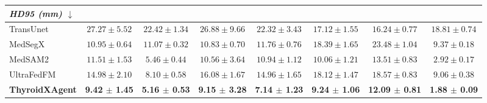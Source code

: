\documentclass[fleqn,10pt]{wlscirep}
\begin{document}
\begin{appendices}
\begin{table}[p]
\begin{threeparttable}
\begin{tabular}{lccccccc}
\midrule
\multicolumn{8}{l}{\textit{HD95 (mm) $\downarrow$}} \\
\midrule
TransUnet~\cite{chen2024transunet}
& $27.27 \pm 5.52$
& $22.42 \pm 1.34$
& $26.88 \pm 9.66$
& $22.32 \pm 3.43$
& $17.12 \pm 1.55$
& $16.24 \pm 0.77$
& $18.81 \pm 0.74$ \\
MedSegX~\cite{zhang2025generalist}
& $10.95 \pm 0.64$
& $11.07 \pm 0.32$
& $10.83 \pm 0.70$
& $11.76 \pm 0.76$
& $18.39 \pm 1.65$
& $23.48 \pm 1.04$
& $9.37 \pm 0.18$ \\
MedSAM2~\cite{ma2025medsam2}
& $11.51 \pm 1.53$
& $5.46 \pm 0.44$
& $10.56 \pm 3.64$
& $10.94 \pm 1.12$
& $10.06 \pm 1.21$
& $13.51 \pm 0.83$
& $2.92 \pm 0.17$ \\
UltraFedFM~\cite{jiang2025pretraining}
& $14.98 \pm 2.10$
& $8.10 \pm 0.58$
& $16.08 \pm 1.67$
& $14.96 \pm 1.65$
& $18.12 \pm 1.47$
& $18.57 \pm 0.83$
& $9.06 \pm 0.38$ \\
\rowcolor{lightgray}
\textbf{ThyroidXAgent}
& \textbf{9.42 $\pm$ 1.45}
& \textbf{5.16 $\pm$ 0.53}
& \textbf{9.15 $\pm$ 3.28}
& \textbf{7.14 $\pm$ 1.23}
& \textbf{9.24 $\pm$ 1.06}
& \textbf{12.09 $\pm$ 0.81}
& \textbf{1.88 $\pm$ 0.09} \\

\bottomrule
\end{tabular}
\end{threeparttable}
\end{table}


\end{appendices}
\end{document}
